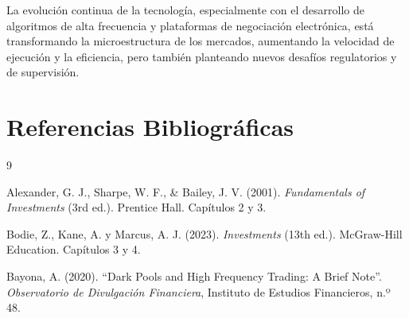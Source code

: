 La evolución continua de la tecnología, especialmente con el desarrollo de algoritmos de alta frecuencia y plataformas de negociación electrónica, está transformando la microestructura de los mercados, aumentando la velocidad de ejecución y la eficiencia, pero también planteando nuevos desafíos regulatorios y de supervisión.

\section{Referencias Bibliográficas}

\begin{thebibliography}{9}

Alexander, G. J., Sharpe, W. F., \& Bailey, J. V. (2001). \textit{Fundamentals of Investments} (3rd ed.). Prentice Hall. Capítulos 2 y 3.

Bodie, Z., Kane, A. y Marcus, A. J. (2023). \textit{Investments} (13th ed.). McGraw-Hill Education. Capítulos 3 y 4.

Bayona, A. (2020). ``Dark Pools and High Frequency Trading: A Brief Note''. \textit{Observatorio de Divulgación Financiera}, Instituto de Estudios Financieros, n.º 48.

\end{thebibliography}



